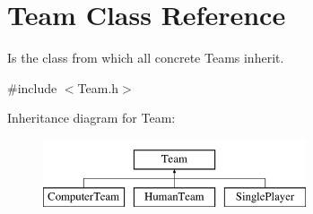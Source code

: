\hypertarget{class_team}{}\section{Team Class Reference}
\label{class_team}


Is the class from which all concrete Teams inherit.  




{\ttfamily \#include $<$Team.\+h$>$}

Inheritance diagram for Team\+:\begin{figure}[H]
\begin{center}
\leavevmode
\includegraphics[height=2.000000cm]{class_team}
\end{center}
\end{figure}

